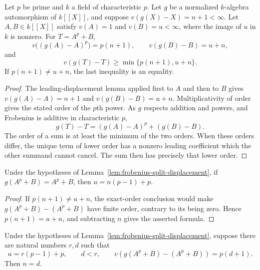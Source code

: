 \begin{lemma}
\label{lem:frobenius-split-displacement}
\leanok
Let $p$ be prime and $k$ a field of characteristic $p$. Let $g$ be a normalized
$k$-algebra automorphism of $k[[X]]$, and suppose
$v(g(X)-X)=n+1<\infty$. Let $A,B\in k[[X]]$ satisfy
$v(A)=1$ and $v(B)=u<\infty$, where the image of $u$ in $k$
is nonzero. For $T=A^p+B$,
\[
 v\bigl((g(A)-A)^p\bigr)=p(n+1),\qquad
 v(g(B)-B)=u+n,
\]
and
\[
 v(g(T)-T)\ge\min\{p(n+1),u+n\}.
\]
If $p(n+1)\ne u+n$, the last inequality is an equality.
\end{lemma}

\begin{proof}
The leading-displacement lemma applied first to $A$ and then to
$B$ gives $v(g(A)-A)=n+1$ and $v(g(B)-B)=u+n$.
Multiplicativity of order gives the stated order of the $p$th
power. As $g$ respects addition and powers, and Frobenius is
additive in characteristic $p$,
\[
 g(T)-T=(g(A)-A)^p+(g(B)-B).
\]
The order of a sum is at least the minimum of the two orders.
When these orders differ, the unique term of lower order has
a nonzero leading coefficient which the other summand cannot
cancel. The sum then has precisely that lower order.
\end{proof}

\begin{lemma}
\label{lem:frobenius-split-fixed-break}
\leanok
Under the hypotheses of Lemma~\ref{lem:frobenius-split-displacement},
if $g(A^p+B)=A^p+B$, then $u=n(p-1)+p$.
\end{lemma}

\begin{proof}
If $p(n+1)\ne u+n$, the exact-order conclusion would make
$g(A^p+B)-(A^p+B)$ have finite order, contrary to its being zero.
Hence $p(n+1)=u+n$, and subtracting $n$ gives the asserted formula.
\end{proof}

\begin{lemma}
\label{lem:frobenius-split-depth-equality}
\leanok
Under the hypotheses of Lemma~\ref{lem:frobenius-split-displacement},
suppose there are natural numbers $r,d$ such that
\[
 u=r(p-1)+p,\qquad d<r,\qquad
 v(g(A^p+B)-(A^p+B))=p(d+1).
\]
Then $n=d$.
\end{lemma}

